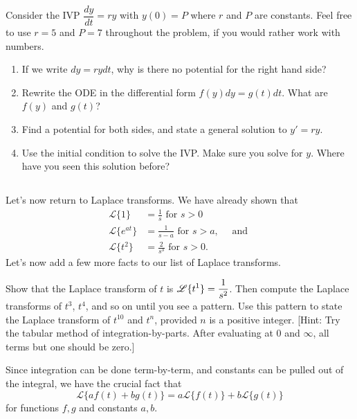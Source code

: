 \begin{problem}
Consider the IVP $\dfrac{dy}{dt}=ry$ with $y(0)=P$ where $r$ and $P$ are constants.  Feel free to use $r=5$ and $P=7$ throughout the problem, if you would rather work with numbers.  
\begin{enumerate}
 \item If we write $dy = rydt$, why is there no potential for the right hand side? 
 \item Rewrite the ODE in the differential form $f(y)dy=g(t)dt$.  What are $f(y)$ and $g(t)$?
 \item Find a potential for both sides, and state a general solution to $y'=ry$.
 \item Use the initial condition to solve the IVP.  Make sure you solve for $y$.  Where have you seen this solution before? 
\end{enumerate}
\end{problem}

\subsection*{\ideaD}

Let's now return to Laplace transforms. We have already shown that 
\begin{align*}
\mathscr{L}\{1\} &= \frac{1}{s}\text{ for $s>0$}\\
\mathscr{L}\{e^{at}\} &= \frac{1}{s-a} \text{ for $s>a$}, \quad \text{ and }\\
\mathscr{L}\{t^2\} &= \frac{2}{s^3}\text{ for $s>0$}.
\end{align*}
Let's now add a few more facts to our list of Laplace transforms. 


\begin{problem}
Show that the Laplace transform of $t$ is $\displaystyle\mathscr{L}\{t^1\} = \frac{1}{s^2}$.
Then compute the Laplace transforms of $t^3$, $t^4$, and so on until you see a pattern. 
Use this pattern to state the Laplace transform of $t^{10}$ and $t^n$, provided $n$ is a positive integer.
[Hint: Try the tabular method of integration-by-parts. After evaluating at 0 and $\infty$, all terms but one should be zero.]
\end{problem}

\begin{theorem}\label{linear combination of laplace transforms}
Since integration can be done term-by-term, and constants can be pulled out of the integral, we have the crucial fact that $$\mathscr{L}\{af(t)+bg(t)\}=a\mathscr{L}\{f(t)\}+b\mathscr{L}\{g(t)\}$$ for functions $f,g$ and constants $a,b$.  
\end{theorem}

